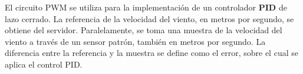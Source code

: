 El circuito PWM se utiliza para la implementación de un controlador \textbf{PID} de lazo cerrado. La referencia de la velocidad del viento, en metros por segundo, se obtiene del servidor. Paralelamente, se toma una muestra de la velocidad del viento a través de un sensor patrón, también en metros por segundo. La diferencia entre la referencia y la muestra se define como el error, sobre el cual se aplica el control PID.



